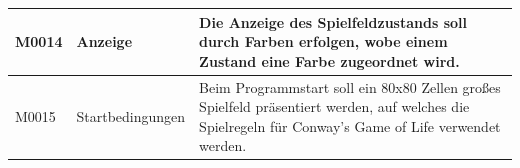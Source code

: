 \documentclass[11pt]{article}
\begin{document}
\begin{longtable}[m]{|m{2.2cm}|m{4cm}|m{8cm}|}
\hline
M0014 & Anzeige & Die Anzeige des Spielfeldzustands soll durch Farben erfolgen, wobe einem Zustand eine Farbe zugeordnet wird.\\
\hline
M0015 & Startbedingungen & Beim Programmstart soll ein 80x80 Zellen großes Spielfeld präsentiert werden, auf welches die Spielregeln für Conway's Game of Life verwendet werden. \\

\hline
\end{longtable}    
\newpage

\end{document}
